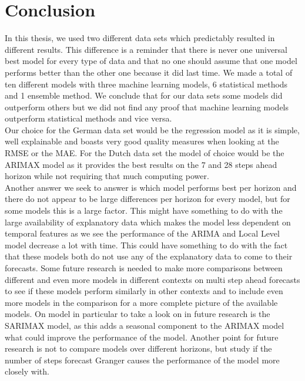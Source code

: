 \section{Conclusion}
\label{seq:conclusion}
In this thesis, we used two different data sets which predictably resulted in different results. This difference is a reminder that there is never one universal best model for every type of data and that no one should assume that one model performs better than the other one because it did last time. We made a total of ten different models with three machine learning models, 6 statistical methods and 1 ensemble method. We conclude that for our data sets some models did outperform others but we did not find any proof that machine learning models outperform statistical methods and vice versa.\\

Our choice for the German data set would be the regression model as it is simple, well explainable and boasts very good quality measures when looking at the RMSE or the MAE. For the Dutch data set the model of choice would be the ARIMAX model as it provides the best results on the 7 and 28 steps ahead horizon while not requiring that much computing power.\\

Another answer we seek to answer is which model performs best per horizon and there do not appear to be large differences per horizon for every model, but for some models this is a large factor. This might have something to do with the large availability of explanatory data which makes the model less dependent on temporal features as we see the performance of the ARIMA and Local Level model decrease a lot with time. This could have something to do with the fact that these models both do not use any of the explanatory data to come to their forecasts. Some future research is needed to make more comparisons between different and even more models in different contexts on multi step ahead forecasts to see if these models perform similarly in other contexts and to include even more models in the comparison for a more complete picture of the available models. On model in particular to take a look on in future research is the SARIMAX model, as this adds a seasonal component to the ARIMAX model what could improve the performance of the model. Another point for future research is not to compare models over different horizons, but study if the number of steps forecast Granger causes the performance of the model more closely with.